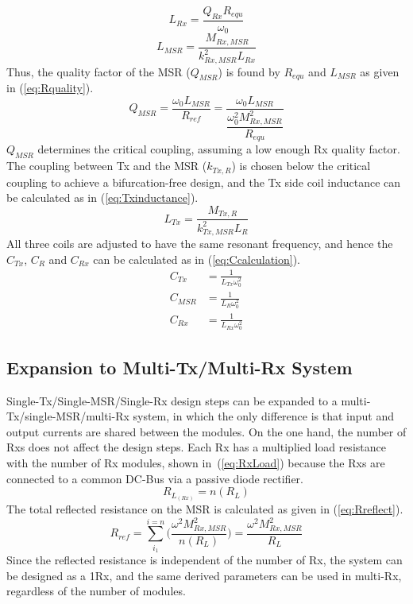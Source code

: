 \documentclass[journal]{IEEEtran}
\begin{document}
  \begin{equation}
  L_{Rx}=\frac{Q_{Rx}R_{equ}}{\omega_{0}}
      \label{eq:Rxinductance}
  \end{equation}
  \begin{equation}
  L_{MSR}=\frac{M_{Rx,MSR}}{k_{Rx,MSR}^2L_{Rx}}
      \label{eq:Rinductance}
  \end{equation}
Thus, the quality factor of the MSR ($Q_{MSR}$) is found by  $R_{equ}$ and $  L_{MSR}$ as given in  (\ref{eq:Rquality}).
\begin{equation}
  Q_{MSR}=\frac{\omega_{0}L_{MSR}}{R_{ref}}=\frac{\omega_{0}L_{MSR}}{\dfrac{\omega_0^2M_{Rx,MSR}^2}{R_{equ}}}
      \label{eq:Rquality}
  \end{equation}
$Q_{MSR}$ determines the critical coupling, assuming a low enough Rx quality factor.
The coupling between Tx and the MSR ($k_{Tx,R}$) is chosen below the critical coupling to achieve a bifurcation-free design, and the Tx side coil inductance can be calculated as in (\ref{eq:Txinductance}).
  \begin{equation}
  L_{Tx}=\frac{M_{Tx,R}}{k_{Tx,MSR}^2L_{R}}
      \label{eq:Txinductance}
  \end{equation}
All three coils are adjusted to have the same resonant frequency, and hence the $C_{Tx}$, $C_{R}$ and $C_{Rx}$ can be calculated as in (\ref{eq:Ccalculation}).
    \begin{equation}
    \label{eq:Ccalculation}
    \begin{split}
  C_{Tx}&=\frac{1}{L_{Tx}\omega_{0}^2}\\
  C_{MSR}&=\frac{1}{L_{R}\omega_{0}^2}\\
  C_{Rx}&=\frac{1}{L_{Rx}\omega_{0}^2}
  \end{split}
  \end{equation}
\subsection{Expansion to Multi-Tx/Multi-Rx System}
Single-Tx/Single-MSR/Single-Rx design steps can be expanded to a multi-Tx/single-MSR/multi-Rx system, in which the only difference is that input and output currents are shared between the modules. 
On the one hand, the number of Rxs does not affect the design steps. 
Each Rx has a multiplied load resistance with the number of Rx modules, shown in~(\ref{eq:RxLoad}) because the Rxs are connected to a common DC-Bus via a passive diode rectifier.
\begin{equation}
    \label{eq:RxLoad}
      R_L_{(Rx)}= n(R_L) 
\end{equation}
The total reflected resistance on the MSR is calculated as given in (\ref{eq:Rreflect}).
\begin{equation}
    \label{eq:Rreflect}
      R_{ref}= \sum^{i=n}_{i_1}\Bigg(\frac{\omega^2M_{Rx,MSR}^2}{n(R_L)}\Bigg)= \frac{\omega^2M_{Rx,MSR}^2}{R_L}
\end{equation}
Since the reflected resistance is independent of the number of Rx, the system can be designed as a 1Rx, and the same derived parameters can be used in multi-Rx, regardless of the number of modules.
\end{document}

